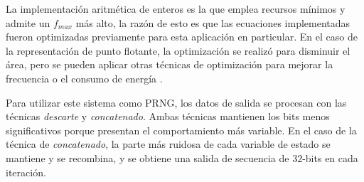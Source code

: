 La implementación aritmética de enteros es la que emplea recursos mínimos y admite un $f_{max}$ más alto, la razón de esto es que las ecuaciones implementadas fueron optimizadas previamente para esta aplicación en particular.
En el caso de la representación de punto flotante, la optimización se realizó para disminuir el área, pero se pueden aplicar otras técnicas de optimización para mejorar la frecuencia o el consumo de energía \cite{Giri2012, Gokul2004}.

Para utilizar este sistema como PRNG, los datos de salida se procesan con las técnicas \textit{descarte} y \textit{concatenado}.
Ambas técnicas mantienen los bits menos significativos porque presentan el comportamiento más variable.
En el caso de la técnica de \textit{concatenado}, la parte más ruidosa de cada variable de estado se mantiene y se recombina, y se obtiene una salida de secuencia de $32$-bits en cada iteración.

